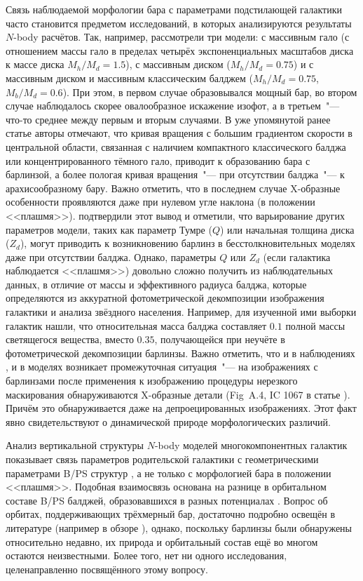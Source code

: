 \documentclass{trlnotes}
\begin{document}
Связь наблюдаемой морфологии бара с параметрами подстилающей галактики часто становится предметом исследований, в которых анализируются результаты $N$-body расчётов. Так, например, \citet{athanassoula2002} рассмотрели три модели: с массивным гало (с отношением массы гало в пределах четырёх экспоненциальных масштабов диска к массе диска $M_h/M_d = 1.5$), с массивным диском ($M_h/M_d = 0.75$) и с массивным диском и массивным классическим балджем ($M_h/M_d = 0.75$, $M_b/M_d = 0.6$). При этом, в первом случае образовывался мощный бар, во втором случае наблюдалось скорее овалообразное искажение изофот, а в третьем~"--- что-то среднее между первым и вторым случаями. В уже упомянутой ранее статье \citet{salo2017} авторы отмечают, что кривая вращения с большим градиентом скорости в центральной области, связанная с наличием компактного классического балджа или концентрированного тёмного гало, приводит к образованию бара с барлинзой, а более пологая кривая вращения~"--- при отсутствии балджа~"--- к арахисообразному бару. Важно отметить, что в последнем случае X-образные особенности проявляются даже при нулевом угле наклона (в положении <<плашмя>>). \citet{smirnov2018} подтвердили этот вывод и отметили, что варьирование других параметров модели, таких как параметр Тумре ($Q$) или начальная толщина диска ($Z_d$), могут приводить к возникновению барлинз в бесстолкновительных моделях даже при отсутствии балджа. Однако, параметры $Q$ или $Z_d$ (если галактика наблюдается <<плашмя>>) довольно сложно получить из наблюдательных данных, в отличие от массы и эффективного радиуса балджа, которые определяются из аккуратной фотометрической декомпозиции изображения галактики и анализа звёздного населения. Например, \citet{laurikainen2014} для изученной ими выборки галактик нашли, что относительная масса балджа составляет $0.1$ полной массы светящегося вещества, вместо $0.35$, получающейся при неучёте в фотометрической декомпозиции барлинзы. Важно отметить, что и в наблюдениях \citep{laurikainen2017}, и в моделях \citep{salo2017} возникает промежуточная ситуация~"--- на изображениях с барлинзами после применения к изображению процедуры нерезкого маскирования обнаруживаются X-образные детали (Fig~A.4, IC 1067 в статье \citealp{laurikainen2017}). Причём это обнаруживается даже на депроецированных изображениях. Этот факт явно свидетельствуют о динамической природе морфологических различий. 

Анализ вертикальной структуры $N$-body моделей многокомпонентных галактик показывает связь параметров родительской галактики с геометрическими параметрами B/PS структур \citep{smirnov2018}, а не только с морфологией бара в положении <<плашмя>>. Подобная взаимосвязь основана на разнице в орбитальном составе B/PS балджей, образовавшихся в разных потенциалах \citep{parul2020}. Вопрос об орбитах, поддерживающих трёхмерный бар, достаточно подробно освещён в литературе (например в обзоре \cite{athanassoula2016}), однако, поскольку барлинзы были обнаружены относительно недавно, их природа и орбитальный состав ещё во многом остаются неизвестными. Более того, нет ни одного исследования, целенаправленно посвящённого этому вопросу.
\end{document}
